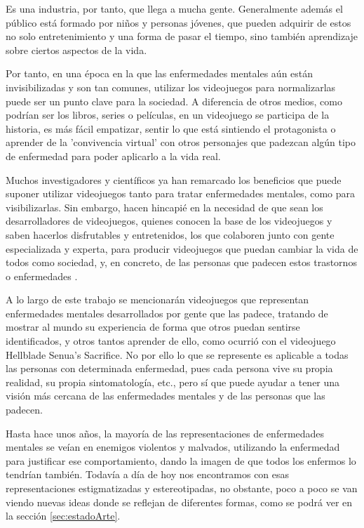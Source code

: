 \documentclass[12pt, a4paper,twoside,titlepage]{book}
\begin{document}
Es una industria, por tanto, que llega a mucha gente. Generalmente además el público está formado por niños y personas jóvenes, que pueden adquirir de estos no solo entretenimiento y una forma de pasar el tiempo, sino también aprendizaje sobre ciertos aspectos de la vida. 

Por tanto, en una época en la que las enfermedades mentales aún están invisibilizadas y son tan comunes, utilizar los videojuegos para normalizarlas puede ser un punto clave para la sociedad. A diferencia de otros medios, como podrían ser los libros, series o películas, en un videojuego se participa de la historia, es más fácil empatizar, sentir lo que está sintiendo el protagonista o aprender de la 'convivencia virtual' con otros personajes que padezcan algún tipo de enfermedad para poder aplicarlo a la vida real. 

Muchos investigadores y científicos ya han remarcado los beneficios que puede suponer utilizar videojuegos tanto para tratar enfermedades mentales, como para visibilizarlas. Sin embargo, hacen hincapié en la necesidad de que sean los desarrolladores de videojuegos, quienes conocen la base de los videojuegos y saben hacerlos disfrutables y entretenidos, los que colaboren junto con gente especializada y experta, para producir videojuegos que puedan cambiar la vida de todos como sociedad, y, en concreto, de las personas que padecen estos trastornos o enfermedades \cite{articuloDesarrolloCient}.

A lo largo de este trabajo se mencionarán videojuegos que representan enfermedades mentales desarrollados por gente que las padece, tratando de mostrar al mundo su experiencia de forma que otros puedan sentirse identificados, y otros tantos aprender de ello, como ocurrió con el videojuego Hellblade Senua's Sacrifice. No por ello lo que se represente es aplicable a todas las personas con determinada enfermedad, pues cada persona vive su propia realidad, su propia sintomatología, etc., pero sí que puede ayudar a tener una visión más cercana de las enfermedades mentales y de las personas que las padecen. 

Hasta hace unos años, la mayoría de las representaciones de enfermedades mentales se veían en enemigos violentos y malvados, utilizando la enfermedad para justificar ese comportamiento, dando la imagen de que todos los enfermos lo tendrían también. Todavía a día de hoy nos encontramos con esas representaciones estigmatizadas y estereotipadas, no obstante, poco a poco se van viendo nuevas ideas donde se reflejan de diferentes formas, como se podrá ver en la sección \ref{sec:estadoArte}. 
\end{document}
